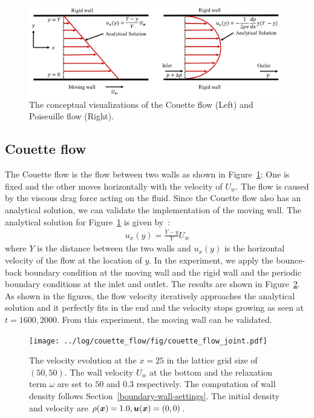 \begin{figure}[H]
  \centering
  \includegraphics[width=0.98\textwidth]{imgs/couette_and_poiseuille.pdf}
  \caption{The conceptual visualizations of the Couette flow (Left) and
  Poiseuille flow (Right).}
  \vspace{-5mm}
  \label{couette-and-poiseuille-conceptual}
\end{figure}


\subsection{Couette flow}
The Couette flow is the flow between two walls as shown in
Figure~\ref{couette-and-poiseuille-conceptual}:
One is fixed and the other moves horizontally with the velocity of $U_w$.
The flow is caused by the viscous drag force acting on the fluid.
Since the Couette flow also has an analytical solution,
we can validate the implementation of the moving wall.
The analytical solution for Figure~\ref{couette-and-poiseuille-conceptual} is given by~\cite{nagy2019graphical}:
\begin{equation}
\begin{aligned}
  u_x(y) =\frac{Y - y}{Y}U_w
\end{aligned}
\end{equation}
where $Y$ is the distance between the two walls
and $u_x(y)$ is the horizontal velocity of the flow
at the location of $y$. 
In the experiment, we apply the bounce-back boundary condition
at the moving wall and the rigid wall
and the periodic boundary conditions at the inlet and outlet.
The results are shown in Figure~\ref{fig:couette-velocity-evolution}.
As shown in the figures, the flow velocity iteratively approaches
the analytical solution and it perfectly fits in the end
and the velocity stops growing as seen at $t=1600, 2000$.
From this experiment, the moving wall can be validated.

\begin{figure}[H]
  \vspace{-1mm}
  \centering
  \texttt{[image: ../log/couette\_flow/fig/couette\_flow\_joint.pdf]}
  \vspace{-5mm}
  \caption{The velocity evolution at
  the $x = 25$ in the lattice grid size of $(50, 50)$.
  The wall velocity $U_w$ at the bottom and the relaxation term $\omega$ are set
  to $50$ and $0.3$ respectively.
  The computation of wall density follows Section~\ref{boundary-wall-settings}.
  The initial density and velocity are $\rho(\boldsymbol{x}) = 1.0, \boldsymbol{u}(\boldsymbol{x}) = (0, 0)$. 
  \label{fig:couette-velocity-evolution}}
\end{figure}

